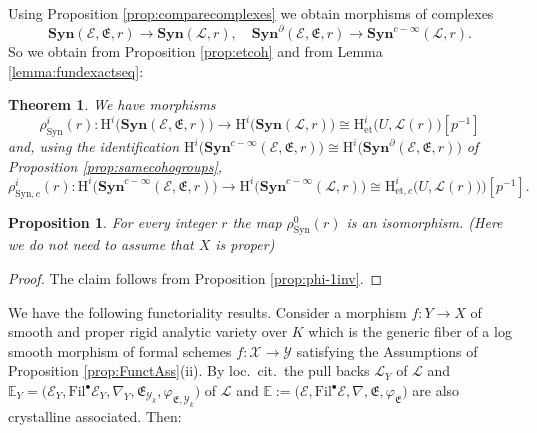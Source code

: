 \documentclass[asterisque,english]{smfart}
\newtheorem{proposition}[theo]{Proposition}
\newtheorem{theorem}{Theorem}[]
\begin{document}
Using Proposition \ref{prop:comparecomplexes} we obtain morphisms of complexes $$\mathbf{Syn}(\mathcal{E},\mathfrak{E},r)\to \mathbf{Syn}(\mathcal{L},r), \quad \mathbf{Syn}^\partial(\mathcal{E},\mathfrak{E},r)\to \mathbf{Syn}^{c-\infty}(\mathcal{L},r).$$
So we obtain from Proposition \ref{prop:etcoh} and from Lemma \ref{lemma:fundexactseq}:

\begin{theorem}\label{thm:comparesynt} We have  morphisms
$$\rho_{\mathrm{Syn}}^i(r)\colon \mathrm{H}^i\bigl(\mathbf{Syn}(\mathcal{E},\mathfrak{E},r)\bigr) \longrightarrow \mathrm{H}^i\bigl(\mathbf{Syn}(\mathcal{L},r)\bigr)\cong  \mathrm{H}^i_{\mathrm{et}}\bigl(U, \mathcal{L}(r)\bigr)[p^{-1}]$$and, using the identification $\mathrm{H}^i\bigl(\mathbf{Syn}^{c-\infty}(\mathcal{E},\mathfrak{E},r)\bigr)\cong \mathrm{H}^i\bigl(\mathbf{Syn}^\partial(\mathcal{E},\mathfrak{E},r)\bigr)$   of Proposition \ref{prop:samecohogroups},
$$\rho_{\mathrm{Syn},c}^i(r)\colon  \mathrm{H}^i\bigl(\mathbf{Syn}^{c-\infty}(\mathcal{E},\mathfrak{E},r)\bigr) \longrightarrow \mathrm{H}^i\bigl(\mathbf{Syn}^{c-\infty}(\mathcal{L},r)\bigr)\cong  \mathrm{H}^i_{\mathrm{et},c}\bigl(U, \mathcal{L}(r)\bigr)\bigr)[p^{-1}] .$$
\end{theorem}


\begin{proposition}\label{prop:comp0}For every integer $r$ the map  $\rho_{\mathrm{Syn}}^0(r)$ is an isomorphism. (Here we do not need to assume that $X$ is proper) 

\end{proposition}
\begin{proof}  The claim follows from  Proposition \ref{prop:phi-1inv}.
\end{proof}





We have the following functoriality results. Consider a morphism $f\colon Y\to X$ of smooth and proper rigid analytic variety over $K$ which is the generic fiber of a  log smooth morphism of formal schemes $f\colon \mathcal{X}\to \mathcal{Y}$ satisfying the Assumptions of  Proposition \ref{prop:FunctAss}(ii). By loc.~cit.~the pull backs $\mathcal{L}_Y$ of $\mathcal{L}$ and  $\mathbb{E}_Y=\bigl(\mathcal{E}_Y,\mathrm{Fil}^\bullet \mathcal{E}_Y, \nabla_Y,\mathfrak{E}_{\mathcal{Y}_k},\varphi_{\mathfrak{E},{\mathcal{Y}_k}}\bigr)$ of $\mathcal{L}$ and $\mathbb{E}:=\bigl(\mathcal{E},\mathrm{Fil}^\bullet \mathcal{E}, \nabla,\mathfrak{E},\varphi_{\mathfrak{E}}\bigr) $ are also crystalline associated. Then:
\end{document}

